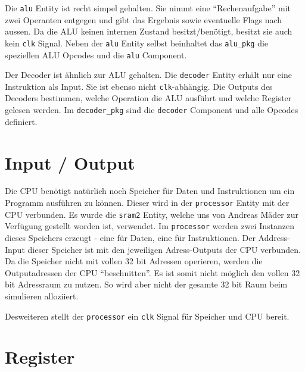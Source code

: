 \documentclass[paper=a4,fontsize=12pt]{scrreprt}
\begin{document}
Die \texttt{alu} Entity ist recht simpel gehalten.
Sie nimmt eine \enquote{Rechenaufgabe} mit zwei Operanten entgegen und gibt das Ergebnis sowie eventuelle Flags nach aussen.
Da die ALU keinen internen Zustand besitzt/benötigt, besitzt sie auch kein \texttt{clk} Signal.
Neben der \texttt{alu} Entity selbst beinhaltet das \texttt{alu\_pkg} die speziellen ALU Opcodes und die \texttt{alu} Component.

Der Decoder ist ähnlich zur ALU gehalten.
Die \texttt{decoder} Entity erhält nur eine Instruktion als Input.
Sie ist ebenso nicht \texttt{clk}-abhängig.
Die Outputs des Decoders bestimmen, welche Operation die ALU ausführt und welche Register gelesen werden.
Im \texttt{decoder\_pkg} sind die \texttt{decoder} Component und alle Opcodes definiert.

\section{Input / Output}

Die CPU benötigt natürlich noch Speicher für Daten und Instruktionen um ein Programm ausführen zu können.
Dieser wird in der \texttt{processor} Entity mit der CPU verbunden.
Es wurde die \texttt{sram2} Entity, welche uns von Andreas Mäder zur Verfügung gestellt worden ist, verwendet.
Im \texttt{processor} werden zwei Instanzen dieses Speichers erzeugt - eine für Daten, eine für Instruktionen.
Der Address-Input dieser Speicher ist mit den jeweiligen Adress-Outputs der CPU verbunden.
Da die Speicher nicht mit vollen 32 bit Adressen operieren, werden die Outputadressen der CPU \enquote{beschnitten}.
Es ist somit nicht möglich den vollen 32 bit Adressraum zu nutzen.
So wird aber nicht der gesamte 32 bit Raum beim simulieren alloziiert.

Desweiteren stellt der \texttt{processor} ein \texttt{clk} Signal für Speicher und CPU bereit.

\section{Register}





\end{document}

